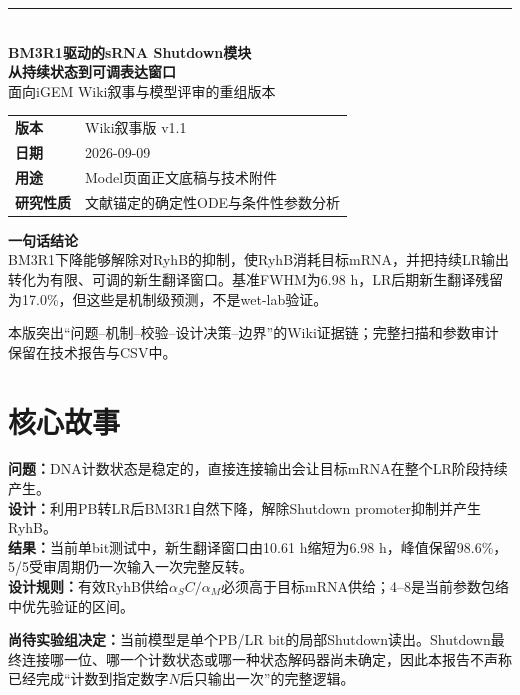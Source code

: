 \documentclass[UTF8,a4paper,11pt,fontset=windows]{ctexart}
\begin{document}
\begin{titlepage}
\thispagestyle{empty}
\vspace*{15mm}
{\color{Teal}\rule{28mm}{2.2pt}}\\[7mm]
{\fontsize{25}{31}\selectfont\bfseries\color{DeepInk}BM3R1驱动的sRNA Shutdown模块}\\[3mm]
{\fontsize{20}{26}\selectfont\bfseries\color{Teal}从持续状态到可调表达窗口}\\[8mm]
{\large\color{MidGray}面向iGEM Wiki叙事与模型评审的重组版本}\\[10mm]
\begin{tabular}{@{}ll@{}}
\textbf{版本} & Wiki叙事版 v1.1\\
\textbf{日期} & 2026-09-09\\
\textbf{用途} & Model页面正文底稿与技术附件\\
\textbf{研究性质} & 文献锚定的确定性ODE与条件性参数分析
\end{tabular}
\vspace{12mm}
\begin{tcolorbox}[colback=DeepInk,colframe=DeepInk,arc=1.5mm,boxrule=0pt,left=5mm,right=5mm,top=4mm,bottom=4mm]
{\color{white}\bfseries 一句话结论}\\[2mm]
{\color{white}BM3R1下降能够解除对RyhB的抑制，使RyhB消耗目标mRNA，并把持续LR输出转化为有限、可调的新生翻译窗口。基准FWHM为6.98 h，LR后期新生翻译残留为17.0\%，但这些是机制级预测，不是wet-lab验证。}
\end{tcolorbox}
\vfill
{\small\color{MidGray}本版突出“问题--机制--校验--设计决策--边界”的Wiki证据链；完整扫描和参数审计保留在技术报告与CSV中。}
\end{titlepage}

\section*{核心故事}
\begin{takeaway}
\textbf{问题：}DNA计数状态是稳定的，直接连接输出会让目标mRNA在整个LR阶段持续产生。\\
\textbf{设计：}利用PB转LR后BM3R1自然下降，解除Shutdown promoter抑制并产生RyhB。\\
\textbf{结果：}当前单bit测试中，新生翻译窗口由10.61 h缩短为6.98 h，峰值保留98.6\%，5/5受审周期仍一次输入一次完整反转。\\
\textbf{设计规则：}有效RyhB供给$\alpha_SC/\alpha_M$必须高于目标mRNA供给；4--8是当前参数包络中优先验证的区间。
\end{takeaway}

\begin{pending}
\textbf{尚待实验组决定：}当前模型是单个PB/LR bit的局部Shutdown读出。Shutdown最终连接哪一位、哪一个计数状态或哪一种状态解码器尚未确定，因此本报告不声称已经完成“计数到指定数字$N$后只输出一次”的完整逻辑。
\end{pending}
\end{document}
